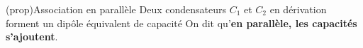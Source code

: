 \documentclass[../../main/main.tex]{subfiles}
\begin{document}
\begin{tcbraster}[raster columns=2, raster equal height=rows]
	\begin{tcb*}[label=prop:cpara](prop){Association en parallèle}
		Deux condensateurs $C_1$ et $C_2$ en dérivation forment un dipôle
		équivalent de capacité
		\psw{%
			\[
				\boxed{C_{\rm eq} = C_1 + C_2}
			\]
		}%
		On dit qu'\textbf{en parallèle, les capacités s'ajoutent}.
		\tcblower
		\begin{center}
\end{center}
\end{tcb*}
\end{tcbraster}
\end{document}
